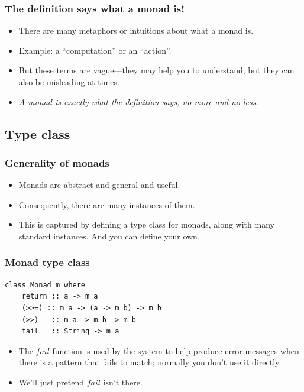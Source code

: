 \documentclass{beamer}
\begin{document}
\begin{frame}[fragile]
\frametitle{The definition says what a monad is!}

\begin{itemize}
\item There are many metaphors or intuitions about what a monad is.
\item Example: a ``computation'' or an ``action''.
\item But these terms are vague---they may help you to understand,
  but they can also be misleading at times.
\item \emph{A monad is exactly what the definition says, no more
    and no less.}
\end{itemize}

\end{frame}

\subsection{Type class}

\begin{frame}[fragile]
\frametitle{Generality of monads}

\begin{itemize}
\item Monads are abstract and general and useful.
\item Consequently, there are many instances of them.
\item This is captured by defining a type class for monads, along
  with many standard instances.  And you can define your own.
\end{itemize}

\end{frame}

\begin{frame}[fragile]
\frametitle{Monad type class}

\begin{verbatim}
class Monad m where
    return :: a -> m a
    (>>=) :: m a -> (a -> m b) -> m b
    (>>)   :: m a -> m b -> m b
    fail   :: String -> m a
\end{verbatim}

\begin{itemize}
\item The $fail$ function is used by the system to help produce
  error messages when there is a pattern that fails to match;
  normally you don't use it directly.
\item We'll just pretend $fail$ isn't there.
\end{itemize}

\end{frame}
\end{document}
